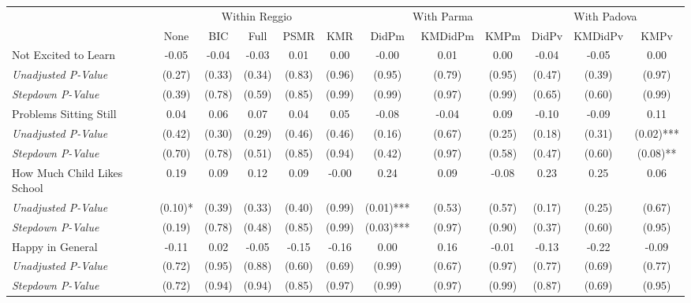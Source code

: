 \begin{tabular}{l c c c c c c c c c c c}
\toprule
& \multicolumn{5}{c}{Within Reggio} & \multicolumn{3}{c}{With Parma} & \multicolumn{3}{c}{With Padova} \\\cmidrule(lr){2-6} \cmidrule(lr){7-9} \cmidrule(lr){10-12}
 & None & BIC & Full & PSMR & KMR & DidPm & KMDidPm & KMPm & DidPv & KMDidPv & KMPv \\
\midrule
Not Excited to Learn & -0.05 & -0.04 & -0.03 & 0.01 & 0.00 & -0.00 & 0.01 & 0.00 & -0.04 & -0.05 & 0.00 \\
\quad \textit{Unadjusted P-Value} & (0.27) & (0.33) & (0.34) & (0.83) & (0.96) & (0.95) & (0.79) & (0.95) & (0.47) & (0.39) & (0.97) \\
\quad \textit{Stepdown P-Value} & (0.39) & (0.78) & (0.59) & (0.85) & (0.99) & (0.99) & (0.97) & (0.99) & (0.65) & (0.60) & (0.99) \\
Problems Sitting Still & 0.04 & 0.06 & 0.07 & 0.04 & 0.05 & -0.08 & -0.04 & 0.09 & -0.10 & -0.09 & 0.11 \\
\quad \textit{Unadjusted P-Value} & (0.42) & (0.30) & (0.29) & (0.46) & (0.46) & (0.16) & (0.67) & (0.25) & (0.18) & (0.31) & (0.02)*** \\
\quad \textit{Stepdown P-Value} & (0.70) & (0.78) & (0.51) & (0.85) & (0.94) & (0.42) & (0.97) & (0.58) & (0.47) & (0.60) & (0.08)** \\
How Much Child Likes School & 0.19 & 0.09 & 0.12 & 0.09 & -0.00 & 0.24 & 0.09 & -0.08 & 0.23 & 0.25 & 0.06 \\
\quad \textit{Unadjusted P-Value} & (0.10)* & (0.39) & (0.33) & (0.40) & (0.99) & (0.01)*** & (0.53) & (0.57) & (0.17) & (0.25) & (0.67) \\
\quad \textit{Stepdown P-Value} & (0.19) & (0.78) & (0.48) & (0.85) & (0.99) & (0.03)*** & (0.97) & (0.90) & (0.37) & (0.60) & (0.95) \\
Happy in General & -0.11 & 0.02 & -0.05 & -0.15 & -0.16 & 0.00 & 0.16 & -0.01 & -0.13 & -0.22 & -0.09 \\
\quad \textit{Unadjusted P-Value} & (0.72) & (0.95) & (0.88) & (0.60) & (0.69) & (0.99) & (0.67) & (0.97) & (0.77) & (0.69) & (0.77) \\
\quad \textit{Stepdown P-Value} & (0.72) & (0.94) & (0.94) & (0.85) & (0.97) & (0.99) & (0.97) & (0.99) & (0.87) & (0.69) & (0.95) \\
\bottomrule
\end{tabular}
